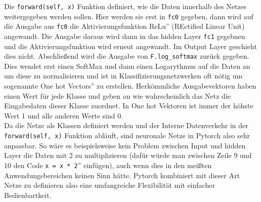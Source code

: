 \documentclass{article}
\begin{document}
Die \texttt{forward(self, x)} Funktion definiert, wie die Daten innerhalb des Netzes weitergegeben werden sollen. Hier werden sie erst in \texttt{fc0} gegeben, dann wird auf die Ausgabe aus \texttt{fc0} die Aktivierungsfunktion \glqq ReLu'' (REctified Linear Unit) angewandt. Die Ausgabe daraus wird dann in das hidden Layer \texttt{fc1} gegebnen und die Aktivierungsfunktion wird erneut angewandt. Im Output Layer geschieht dies nicht. Abschließend wird die Ausgabe von \texttt{F.log_softmax} zurück gegeben. Dies wendet erst einen SoftMax und dann einen Logarythmus auf die Daten an \cite{6} um diese zu normalisieren und ist in Klassifizierungsnetzwerken oft nötig um sogenannte \glqq One hot Vectors'' zu erstellen. Herkömmliche Ausgabevektoren haben einen Wert für jede Klasse und geben an wie wahrscheinlich das Netz die Eingabedaten dieser Klasse zuordnet. In One hot Vektoren ist immer der höhste Wert 1 und alle anderen Werte sind 0.\\
Da die Netze als Klassen definiert werden und der Interne Datenverkehr in der\\ \texttt{forward(self, x)} Funktion abläuft, sind neuronale Netze in Pytorch also sehr anpassbar. So wäre es beispielsweise kein Problem zwischen Input und hidden Layer die Daten mit 2 zu multiplizieren (dafür würde man zwischen Zeile 9 und 10 den Code \glqq\texttt{x = x * 2}'' einfügen), auch wenn dies in den meißten Anwendungsbereichen keinen Sinn hätte. Pytorch kombiniert mit dieser Art Netze zu definieren also eine umfangreiche Flexibilität mit einfacher Bedienbartkeit.
\end{document}
